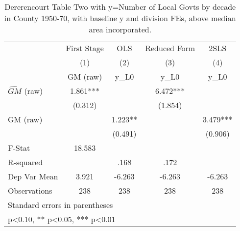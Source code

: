 \begin{table}[htbp]\centering
\def\sym#1{\ifmmode^{#1}\else\(^{#1}\)\fi}
\caption{Dererencourt Table Two with y=Number of Local Govts by decade in County 1950-70, with baseline y and division FEs, above median area incorporated.}
\begin{tabular}{l*{4}{c}}
\toprule
                    & First Stage   &         OLS   &Reduced Form   &        2SLS   \\
                    &\multicolumn{1}{c}{(1)}&\multicolumn{1}{c}{(2)}&\multicolumn{1}{c}{(3)}&\multicolumn{1}{c}{(4)}\\
                    &\multicolumn{1}{c}{GM  (raw)}&\multicolumn{1}{c}{y\_L0}&\multicolumn{1}{c}{y\_L0}&\multicolumn{1}{c}{y\_L0}\\
\midrule
$\hat{GM}$ (raw)    &       1.861***&               &       6.472***&               \\
                    &     (0.312)   &               &     (1.854)   &               \\
\addlinespace
GM  (raw)           &               &       1.223** &               &       3.479***\\
                    &               &     (0.491)   &               &     (0.906)   \\
\midrule
F-Stat              &      18.583   &               &               &               \\
R-squared           &               &        .168   &        .172   &               \\
Dep Var Mean        &       3.921   &      -6.263   &      -6.263   &      -6.263   \\
Observations        &         238   &         238   &         238   &         238   \\
\bottomrule
\multicolumn{5}{l}{\footnotesize Standard errors in parentheses}\\
\multicolumn{5}{l}{\footnotesize * p<0.10, ** p<0.05, *** p<0.01}\\
\end{tabular}
\end{table}
